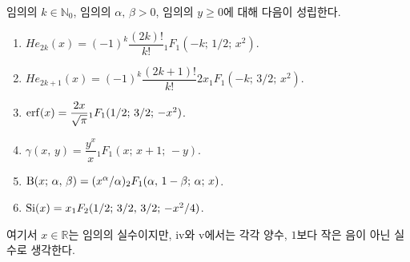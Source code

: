\begin{theorem}
    임의의 $k\in\mathbb{N}_0$, 임의의 $\alpha,\,\beta>0$, 임의의 $y\geq0$에 대해 다음이 성립한다.
    \begin{enumerate}
        \item $He_{2k}(x)=(-1)^k\dfrac{(2k)!}{k!}{}_1F_1(-k;\,1/2;\,x^2)$.
        \item $He_{2k+1}(x)=(-1)^k\dfrac{(2k+1)!}{k!}2x_1F_1(-k;\,3/2;\,x^2)$.
        \item $\mathrm{erf}(x)=\dfrac{2x}{\sqrt{\pi}}{}_1F_1(1/2;\,3/2;\,-x^2)$.
        \item $\gamma(x,\,y)=\dfrac{y^x}{x}{}_1F_1(x;\,x+1;\,-y)$.
        \item $\mathrm{B}(x;\,\alpha,\,\beta)=(x^\alpha/\alpha)_2F_1(\alpha,\,1-\beta;\,\alpha;\,x)$.
        \item $\mathrm{Si}(x)=x_1F_2(1/2;\,3/2,\,3/2;\,-x^2/4)$.
    \end{enumerate}
    여기서 $x\in\mathbb{R}$는 임의의 실수이지만, iv와 v에서는 각각 양수, $1$보다 작은 음이 아닌 실수로 생각한다.
\end{theorem}

